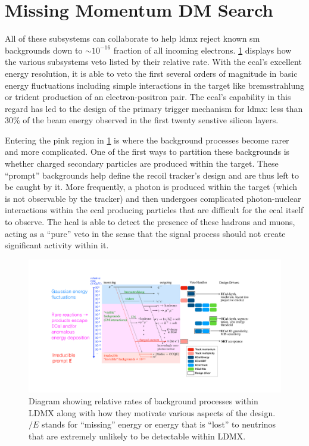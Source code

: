 \section{Missing Momentum DM Search}
All of these subsystems can collaborate to help \ac{ldmx} reject known \ac{sm} backgrounds
down to $\sim 10^{-16}$ fraction of all incoming electrons. \cref{fig:ldmx-bkgd-staircase}
displays how the various subsystems veto listed by their relative rate.
With the \ac{ecal}'s excellent energy resolution, it is able to veto the first several
orders of magnitude in basic energy fluctuations including simple interactions in the
target like bremsstrahlung or trident production of an electron-positron pair.
The \ac{ecal}'s capability in this regard has led to the design of the primary
trigger mechanism for \ac{ldmx}: less than $30\%$ of the beam energy observed in the
first twenty senstive silicon layers.

Entering the pink region in \cref{fig:ldmx-bkgd-staircase} is where the background processes
become rarer and more complicated. One of the first ways to partition these backgrounds is
whether charged secondary particles are produced within the target. These ``prompt'' backgrounds
help define the recoil tracker's design and are thus left to be caught by it. More frequently,
a photon is produced within the target (which is not observable by the tracker) and then undergoes
complicated photon-nuclear interactions within the \ac{ecal} producing particles that are difficult
for the \ac{ecal} itself to observe. The \ac{hcal} is able to detect the presence of these hadrons
and muons, acting as a ``pure'' veto in the sense that the signal process should not create
significant activity within it.

\begin{figure}
	\centering
	\includegraphics[width=\textwidth]{figures/ldmx/experiment/reaction_staircase_with_designDrivers.pdf}
	\caption{
		Diagram showing relative rates of background processes within LDMX along with
		how they motivate various aspects of the design. $\slash{E}$ stands for ``missing''
		energy or energy that is ``lost'' to neutrinos that are extremely unlikely to be
		detectable within LDMX.
	}
	\label{fig:ldmx-bkgd-staircase}
\end{figure}

